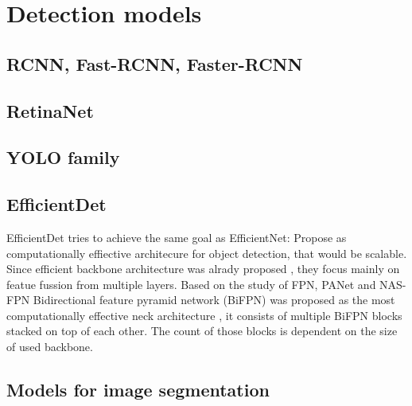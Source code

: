 \section{Detection models}

\subsection{RCNN, Fast-RCNN, Faster-RCNN}

\subsection{RetinaNet}

\subsection{YOLO family}

\subsection{EfficientDet}
EfficientDet tries to achieve the same goal as EfficientNet: Propose as computationally effiective architecure for object detection, that would be scalable. Since efficient backbone architecture was alrady proposed \cite{Tan2019a}, they focus mainly on featue fussion from multiple layers. Based on the study of FPN, PANet and NAS-FPN Bidirectional feature pyramid network (BiFPN) was proposed as the most computationally effective neck architecture \cite{Tan2019}, it consists of multiple BiFPN blocks stacked on top of each other. The count of those blocks is dependent on the size of used backbone.

\subsection{Models for image segmentation}

